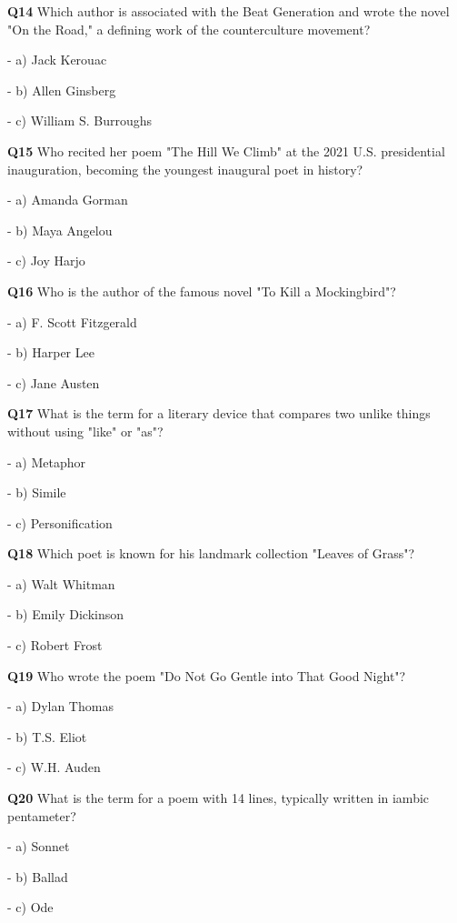 \textbf{Q14} Which author is associated with the Beat Generation and wrote the novel "On the Road," a defining work of the counterculture movement?\par
\quad - a) Jack Kerouac\par
\quad - b) Allen Ginsberg\par
\quad - c) William S. Burroughs\par

\textbf{Q15} Who recited her poem "The Hill We Climb" at the 2021 U.S. presidential inauguration, becoming the youngest inaugural poet in history?\par
\quad - a) Amanda Gorman\par
\quad - b) Maya Angelou\par
\quad - c) Joy Harjo\par

\textbf{Q16} Who is the author of the famous novel "To Kill a Mockingbird"?\par
\quad - a) F. Scott Fitzgerald\par
\quad - b) Harper Lee\par
\quad - c) Jane Austen\par

\textbf{Q17} What is the term for a literary device that compares two unlike things without using "like" or "as"?\par
\quad - a) Metaphor\par
\quad - b) Simile\par
\quad - c) Personification\par

\textbf{Q18} Which poet is known for his landmark collection "Leaves of Grass"?\par
\quad - a) Walt Whitman\par
\quad - b) Emily Dickinson\par
\quad - c) Robert Frost\par

\textbf{Q19} Who wrote the poem "Do Not Go Gentle into That Good Night"?\par
\quad - a) Dylan Thomas\par
\quad - b) T.S. Eliot\par
\quad - c) W.H. Auden\par

\textbf{Q20} What is the term for a poem with 14 lines, typically written in iambic pentameter?\par
\quad - a) Sonnet\par
\quad - b) Ballad\par
\quad - c) Ode\par

